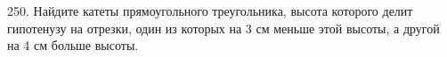 250. Найдите катеты прямоугольного треугольника, высота
которого делит гипотенузу на отрезки, один из которых
на 3 см меньше этой высоты, а другой на 4 см больше
высоты.\\
